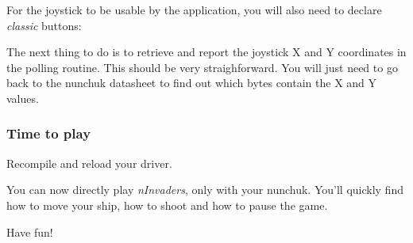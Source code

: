 For the joystick to be usable by the application, you will also
need to declare {\em classic} buttons:


The next thing to do is to retrieve and report the joystick X and Y
coordinates in the polling routine. This should be very straighforward.
You will just need to go back to the nunchuk datasheet to find out
which bytes contain the X and Y values.

\subsubsection{Time to play}

Recompile and reload your driver.

You can now directly play {\em nInvaders}, only with your nunchuk.
You'll quickly find how to move your ship, how to shoot and how
to pause the game.

Have fun!
